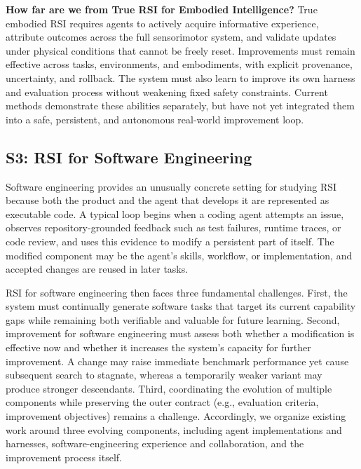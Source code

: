 \begin{tcolorbox}[
    width=\linewidth,
    colback=gray!7,
    colframe=gray!45,
    boxrule=0.9pt,
    arc=2mm,
    outer arc=2mm,
    left=7pt,
    right=7pt,
    top=5pt,
    bottom=5pt,
    boxsep=0pt,
    before skip=5pt,
    after skip=5pt
]
\textbf{How far are we from True RSI for Embodied Intelligence?}
True embodied RSI requires agents to actively acquire informative experience, attribute outcomes across the full sensorimotor system, and validate updates under physical conditions that cannot be freely reset. Improvements must remain effective across tasks, environments, and embodiments, with explicit provenance, uncertainty, and rollback. The system must also learn to improve its own harness and evaluation process without weakening fixed safety constraints. Current methods demonstrate these abilities separately, but have not yet integrated them into a safe, persistent, and autonomous real-world improvement loop.
\end{tcolorbox}



\subsection{S3: RSI for Software Engineering}
\label{subsec:s3}

Software engineering provides an unusually concrete setting for studying RSI because both the product and the agent that develops it are represented as executable code. A typical loop begins when a coding agent attempts an issue, observes repository-grounded feedback such as test failures, runtime traces, or code review, and uses this evidence to modify a persistent part of itself. The modified component may be the agent's skills, workflow, or implementation, and accepted changes are reused in later tasks.

RSI for software engineering then faces three fundamental challenges. 
First, the system must continually generate software tasks that target its current capability gaps while remaining both verifiable and valuable for future learning.
Second, improvement for software engineering must assess both whether a modification is effective now and whether it increases the system's capacity for further improvement. A change may raise immediate benchmark performance yet cause subsequent search to stagnate, whereas a temporarily weaker variant may produce stronger descendants.
Third, coordinating the evolution of multiple components while preserving the outer contract (e.g., evaluation criteria, improvement objectives) remains a challenge. 
Accordingly, we organize existing work around three evolving components, including agent implementations and harnesses, software-engineering experience and collaboration, and the improvement process itself.

